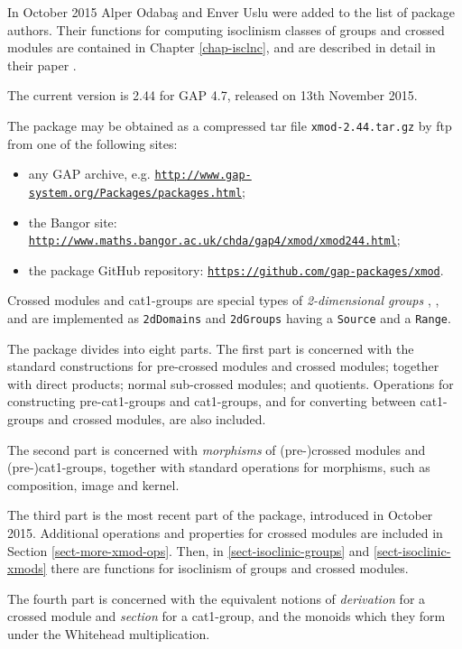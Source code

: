\documentclass[a4paper,11pt]{report}
\begin{document}
{ In October 2015 Alper Odaba{\c s} and Enver Uslu were added to the list of
package authors. Their functions for computing isoclinism classes of groups
and crossed modules are contained in Chapter \ref{chap-isclnc}, and are described in detail in their paper \cite{IOU1}. 

 The current version is 2.44 for \textsf{GAP} 4.7, released on 13th November 2015. 

 The package may be obtained as a compressed tar file \texttt{xmod-2.44.tar.gz} by ftp from one of the following sites: 
\begin{itemize}
\item  any \textsf{GAP} archive, e.g. \href{http://www.gap-system.org/Packages/packages.html} {\texttt{http://www.gap-system.org/Packages/packages.html}}; 
\item  the Bangor site: \href{http://www.maths.bangor.ac.uk/chda/gap4/xmod/xmod244.html} {\texttt{http://www.maths.bangor.ac.uk/chda/gap4/xmod/xmod244.html}}; 
\item  the package GitHub repository: \href{https://github.com/gap-packages/xmod} {\texttt{https://github.com/gap-packages/xmod}}. 
\end{itemize}
 

 Crossed modules and cat1-groups are special types of \emph{2-dimensional groups} \cite{B82}, \cite{brow:hig:siv}, and are implemented as \texttt{2dDomains} and \texttt{2dGroups} having a \texttt{Source} and a \texttt{Range}.   

 The package divides into eight parts. The first part is concerned with the
standard constructions for pre-crossed modules and crossed modules; together
with direct products; normal sub-crossed modules; and quotients. Operations
for constructing pre-cat1-groups and cat1-groups, and for converting between
cat1-groups and crossed modules, are also included. 

 The second part is concerned with \emph{morphisms} of (pre-)crossed modules and (pre-)cat1-groups, together with standard
operations for morphisms, such as composition, image and kernel. 

 The third part is the most recent part of the package, introduced in October
2015. Additional operations and properties for crossed modules are included in
Section \ref{sect-more-xmod-ops}. Then, in \ref{sect-isoclinic-groups} and \ref{sect-isoclinic-xmods} there are functions for isoclinism of groups and crossed modules. 

 The fourth part is concerned with the equivalent notions of \emph{derivation} for a crossed module and \emph{section} for a cat1-group, and the monoids which they form under the Whitehead
multiplication. 

}
\end{document}
